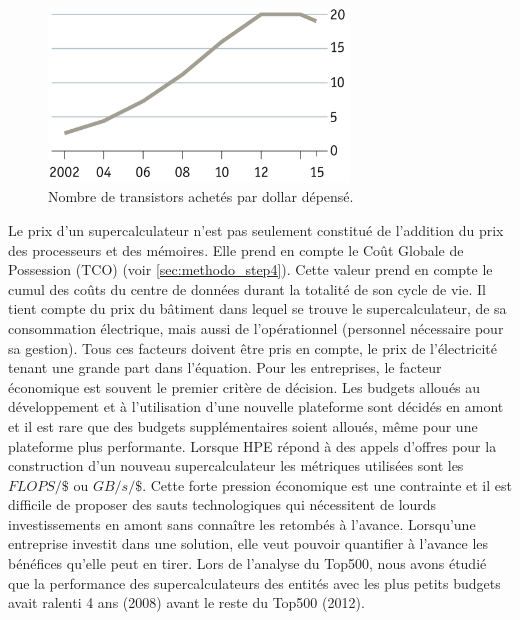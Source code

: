         \begin{figure}
        \center
        \includegraphics[width=8cm]{images/edl_moore_dollars.png}
        \caption{\label{fig:edl_moore_dollars} Nombre de transistors achetés par dollar dépensé\protect\footnotemark.}
        \end{figure}

    
        Le prix d'un supercalculateur n'est pas seulement constitué de l'addition du prix des processeurs et des mémoires. Elle prend en compte le Coût Globale de Possession (TCO) (voir \autoref{sec:methodo_step4}). Cette valeur prend en compte le cumul des coûts du centre de données durant la totalité de son cycle de vie. Il tient compte du prix du bâtiment dans lequel se trouve le supercalculateur, de sa consommation électrique, mais aussi de l'opérationnel (personnel nécessaire pour sa gestion). Tous ces facteurs doivent être pris en compte, le prix de l'électricité tenant une grande part dans l'équation. 
        Pour les entreprises, le facteur économique est souvent le premier critère de décision. Les budgets alloués au développement et à l'utilisation d'une nouvelle plateforme sont décidés en amont et il est rare que des budgets supplémentaires soient alloués, même pour une plateforme plus performante. Lorsque HPE répond à des appels d'offres pour la construction d'un nouveau supercalculateur les métriques utilisées sont les $FLOPS/\$$ ou $GB/s/\$$. Cette forte pression économique est une contrainte et il est difficile de proposer des sauts technologiques qui nécessitent de lourds investissements en amont sans connaître les retombés à l'avance. Lorsqu'une entreprise investit dans une solution, elle veut pouvoir quantifier à l'avance les bénéfices qu'elle peut en tirer. Lors de l'analyse du Top500, nous avons étudié que la performance des supercalculateurs des entités avec les plus petits budgets avait ralenti 4 ans (2008) avant le reste du Top500 (2012). 
    
